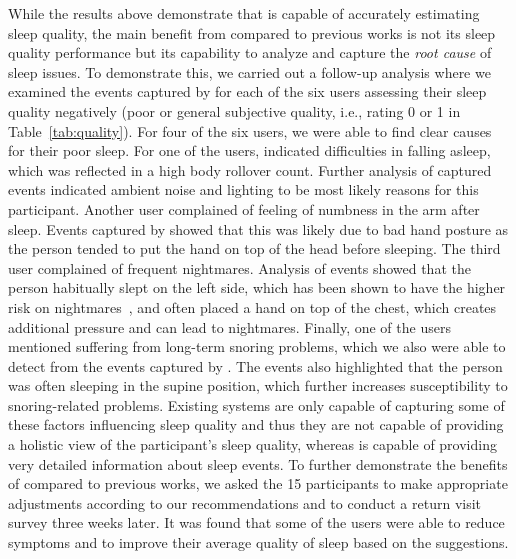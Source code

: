 While the results above demonstrate that {\systemname} is capable of accurately estimating sleep quality, the main benefit from
{\systemname} compared to previous works is not its sleep quality performance but its capability to analyze and capture the {\em root
cause} of sleep issues. To demonstrate this, we carried out a follow-up analysis where we examined the events captured by {\systemname} for
each of the six users assessing their sleep quality negatively (poor or general subjective quality, i.e., rating 0 or 1 in
Table~\ref{tab:quality}). For four of the six users, we were able to find clear causes for their poor sleep. For one of the users,
{\systemname} indicated difficulties in falling asleep, which was reflected in a high body rollover count. Further analysis of captured
events indicated ambient noise and lighting to be most likely reasons for this participant. Another user complained of feeling of numbness
in the arm after sleep. Events captured by {\systemname} showed that this was likely due to bad hand posture as the person tended to put
the hand on top of the head before sleeping. The third user complained of frequent nightmares. Analysis of {\systemname} events showed that
the person habitually slept on the left side, which has been shown to have the higher risk on nightmares~\cite{nightmare}, and often placed
a hand on top of the chest, which creates additional pressure and can lead to nightmares. Finally, one of the users mentioned suffering
from long-term snoring problems, which we also were able to detect from the events captured by {\systemname}. The events also highlighted
that the person was often sleeping in the supine position, which further increases susceptibility to snoring-related problems. Existing
systems are only capable of capturing some of these factors influencing sleep quality and thus they are not capable of providing a holistic
view of the participant's sleep quality, whereas {\systemname} is capable of providing very detailed information about sleep events. To
further demonstrate the benefits of {\systemname} compared to previous works, we asked the 15 participants to make appropriate adjustments
according to our recommendations and to conduct a return visit survey three weeks later. It was found that some of the users were able to
reduce symptoms and to improve their average quality of sleep based on the suggestions. 	


